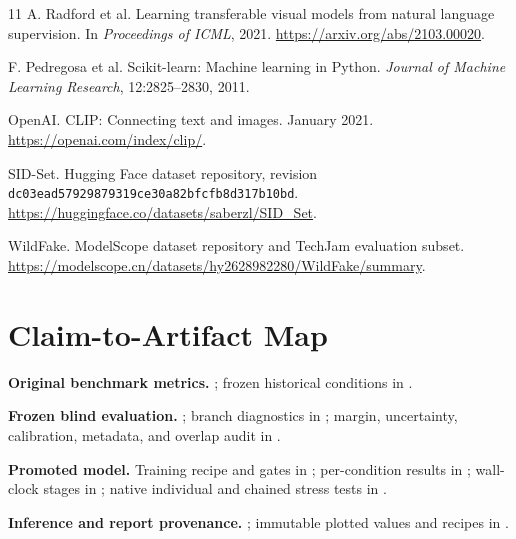 \documentclass[10pt,twocolumn]{article}
\newcommand{\code}[1]{\texttt{#1}}
\begin{document}
\begin{thebibliography}{11}
A. Radford et al.
\newblock Learning transferable visual models from natural language supervision.
\newblock In \emph{Proceedings of ICML}, 2021.
\newblock \url{https://arxiv.org/abs/2103.00020}.

F. Pedregosa et al.
\newblock Scikit-learn: Machine learning in Python.
\newblock \emph{Journal of Machine Learning Research}, 12:2825--2830, 2011.

OpenAI.
\newblock CLIP: Connecting text and images.
 January 2021. \url{https://openai.com/index/clip/}.

SID-Set.
\newblock Hugging Face dataset repository, revision
\code{dc03ead57929879319ce30a82bfcfb8d317b10bd}.
\newblock \url{https://huggingface.co/datasets/saberzl/SID_Set}.

WildFake.
\newblock ModelScope dataset repository and TechJam evaluation subset.
\newblock \url{https://modelscope.cn/datasets/hy2628982280/WildFake/summary}.

\end{thebibliography}

\appendix
\section{Claim-to-Artifact Map}

\small
\noindent\textbf{Original benchmark metrics.}
; frozen historical conditions in
.

\noindent\textbf{Frozen blind evaluation.}
; branch diagnostics in
; margin, uncertainty, calibration, metadata, and overlap
audit in .

\noindent\textbf{Promoted model.}
Training recipe and gates in ; per-condition results in
; wall-clock stages in
; native individual and chained stress tests in
.

\noindent\textbf{Inference and report provenance.}
; immutable plotted values and recipes in
.
\end{document}

